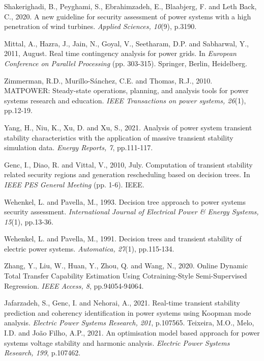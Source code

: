 \begin{thebibliography}{99}
\begin{singlespace}
 Shakerighadi, B., Peyghami, S., Ebrahimzadeh, E., Blaabjerg, F. and Leth Back, C., 2020. A new guideline for security assessment of power systems with a high penetration of wind turbines. \textit{Applied Sciences, 10}(9), p.3190.

 Mittal, A., Hazra, J., Jain, N., Goyal, V., Seetharam, D.P. and Sabharwal, Y., 2011, August. Real time contingency analysis for power grids. In \textit{European Conference on Parallel Processing }(pp. 303-315). Springer, Berlin, Heidelberg.



  Zimmerman, R.D., Murillo-Sánchez, C.E. and Thomas, R.J., 2010. MATPOWER: Steady-state operations, planning, and analysis tools for power systems research and education. \textit{IEEE Transactions on power systems, 26}(1), pp.12-19.

 Yang, H., Niu, K., Xu, D. and Xu, S., 2021. Analysis of power system transient stability characteristics with the application of massive transient stability simulation data.\textit{ Energy Reports, 7}, pp.111-117.

 Genc, I., Diao, R. and Vittal, V., 2010, July. Computation of transient stability related security regions and generation rescheduling based on decision trees. In \textit{IEEE PES General Meeting} (pp. 1-6). IEEE.

 Wehenkel, L. and Pavella, M., 1993. Decision tree approach to power systems security assessment. \textit{International Journal of Electrical Power \& Energy Systems, 15}(1), pp.13-36.

 Wehenkel, L. and Pavella, M., 1991. Decision trees and transient stability of electric power systems. \textit{Automatica, 27}(1), pp.115-134.

 Zhang, Y., Liu, W., Huan, Y., Zhou, Q. and Wang, N., 2020. Online Dynamic Total Transfer Capability Estimation Using Cotraining-Style Semi-Supervised Regression. \textit{IEEE Access, 8}, pp.94054-94064.

 Jafarzadeh, S., Genc, I. and Nehorai, A., 2021. Real-time transient stability prediction and coherency identification in power systems using Koopman mode analysis. \textit{Electric Power Systems Research, 201}, p.107565.
 Teixeira, M.O., Melo, I.D. and João Filho, A.P., 2021. An optimisation model based approach for power systems voltage stability and harmonic analysis. \textit{Electric Power Systems Research, 199}, p.107462.


\end{singlespace}
\end{thebibliography}

